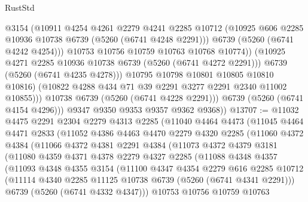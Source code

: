 \begin{lexlean}{RustStd}
\begin{coremodule}
                        @3154
                        (@10911
                          @4254
                          @4261
                          @2279
                          @4241
                          @2285
                          @10712
                          (@10925 @606 @2285 @10936 @10738 @6739 (@5260 (@6741 @4248 @2291)))
                          @6739
                          (@5260 (@6741 @4242 @4254)))
                        @10753
                        @10756
                        @10759
                        @10763
                        @10768
                        @10774))
                    (@10925 @4271 @2285 @10936 @10738 @6739 (@5260 (@6741 @4272 @2291)))
                    @6739
                    (@5260 (@6741 @4235 @4278)))
                  @10795
                  @10798
                  @10801
                  @10805
                  @10810
                  @10816)
                (@10822 @4288 @434 @71 @39 @2291 @3277 @2291 @2340 @11002 @10855)))
            @10738
            @6739
            (@5260 (@6741 @4228 @2291)))
          @6739
          (@5260 (@6741 @4154 @4296)))
        @9347
        @9350
        @9353
        @9357
        @9362
        @9368))
@13707 := @11032
    @4475
    @2291
    @2304
    @2279
    @4313
    @2285
    (@11040
      @4464
      @4473
      (@11045
        @4464
        @4471
        @2833
        (@11052
          @4386
          @4463
          @4470
          @2279
          @4320
          @2285
          (@11060
            @4372
            @4384
            (@11066
              @4372
              @4381
              @2291
              @4384
              (@11073
                @4372
                @4379
                @3181
                (@11080
                  @4359
                  @4371
                  @4378
                  @2279
                  @4327
                  @2285
                  (@11088
                    @4348
                    @4357
                    (@11093
                      @4348
                      @4355
                      @3154
                      (@11100
                        @4347
                        @4354
                        @2279
                        @616
                        @2285
                        @10712
                        (@11114 @4340 @2285 @11125 @10738 @6739 (@5260 (@6741 @4341 @2291)))
                        @6739
                        (@5260 (@6741 @4332 @4347)))
                      @10753
                      @10756
                      @10759
                      @10763

\end{coremodule}
\end{lexlean}

